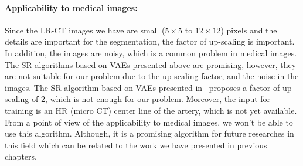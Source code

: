 \paragraph*{Applicability to medical images: }
\label{sec:applicability_sr}
Since the  LR-CT images we have are small ($5\times 5$ to $12\times 12$) pixels  
and the details are important for the segmentation, 
the factor of up-scaling is important.
In addition, the images are noisy, which is a common problem in medical images.
The SR algorithms based on VAEs presented above are promising, however,
they are not suitable for our problem due to the up-scaling factor, and the
noise in the images. The SR algorithm based on VAEs presented 
in~\citep{gatopoulos2020super} proposes 
a factor of up-scaling of 2, which is not enough for our problem. Moreover, 
the input for training is an HR (micro CT) center line of the artery, 
which is not yet available. 
From a point of view of the applicability to medical images, 
we won't be able to use this algorithm. Although, it is a promising algorithm
for future researches in this field which can be related to the  work 
we have presented in previous chapters.






